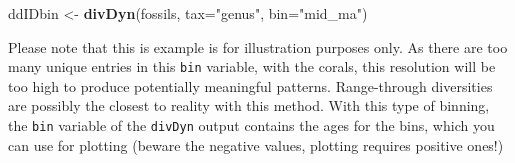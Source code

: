 \documentclass[]{article}
\newenvironment{Shaded}{\begin{snugshade}}{\end{snugshade}}
\newcommand{\CommentTok}[1]{\textcolor[rgb]{0.56,0.35,0.01}{\textit{#1}}}
\newcommand{\DataTypeTok}[1]{\textcolor[rgb]{0.13,0.29,0.53}{#1}}
\newcommand{\DecValTok}[1]{\textcolor[rgb]{0.00,0.00,0.81}{#1}}
\newcommand{\KeywordTok}[1]{\textcolor[rgb]{0.13,0.29,0.53}{\textbf{#1}}}
\newcommand{\NormalTok}[1]{#1}
\newcommand{\OperatorTok}[1]{\textcolor[rgb]{0.81,0.36,0.00}{\textbf{#1}}}
\newcommand{\StringTok}[1]{\textcolor[rgb]{0.31,0.60,0.02}{#1}}
\begin{document}
\begin{Shaded}
\begin{Highlighting}[]
\NormalTok{ddIDbin <-}\StringTok{ }\KeywordTok{divDyn}\NormalTok{(fossils, }\DataTypeTok{tax=}\StringTok{"genus"}\NormalTok{, }\DataTypeTok{bin=}\StringTok{"mid_ma"}\NormalTok{)}
\end{Highlighting}
\end{Shaded}

Please note that this is example is for illustration purposes only. As
there are too many unique entries in this \texttt{bin} variable, with
the corals, this resolution will be too high to produce potentially
meaningful patterns. Range-through diversities are possibly the closest
to reality with this method. With this type of binning, the \texttt{bin}
variable of the \texttt{divDyn} output contains the ages for the bins,
which you can use for plotting (beware the negative values, plotting
requires positive ones!)

\begin{Shaded}
\end{Shaded}
\end{document}
